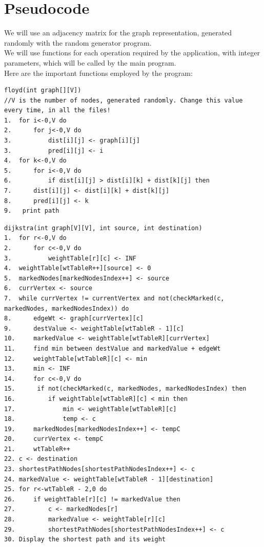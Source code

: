 \documentclass[14pt]{article}
\begin{document}
\section*{Pseudocode}
We will use an adjacency matrix for the graph representation, generated randomly with the random generator program. 
\\
We will use functions for each operation required by the application, with integer parameters, which will be called by the main program.
\\
Here are the important functions employed by the program:
\begin{lstlisting}
floyd(int graph[][V])
//V is the number of nodes, generated randomly. Change this value every time, in all the files!
1.	for i<-0,V do
2.	    for j<-0,V do
3.	        dist[i][j] <- graph[i][j]
3.          pred[i][j] <- i
4.	for k<-0,V do
5.      for i<-0,V do
6.          if dist[i][j] > dist[i][k] + dist[k][j] then
7.      dist[i][j] <- dist[i][k] + dist[k][j]
8.      pred[i][j] <- k
9.   print path
\end{lstlisting}
\begin{lstlisting}
dijkstra(int graph[V][V], int source, int destination)
1.	for r<-0,V do
2.	    for c<-0,V do
3.	        weightTable[r][c] <- INF
4.	weightTable[wtTableR++][source] <- 0
5.	markedNodes[markedNodesIndex++] <- source
6.	currVertex <- source  
7.	while currVertex != currentVertex and not(checkMarked(c, markedNodes, markedNodesIndex)) do
8.	    edgeWt <- graph[currVertex][c]
9.		destValue <- weightTable[wtTableR - 1][c]
10.		markedValue <- weightTable[wtTableR][currVertex]
11.		find min between destValue and markedValue + edgeWt
12.	    weightTable[wtTableR][c] <- min
13.	    min <- INF
14.     for c<-0,V do
15.      if not(checkMarked(c, markedNodes, markedNodesIndex) then
16.         if weightTable[wtTableR][c] < min then
17.             min <- weightTable[wtTableR][c]
18.             temp <- c
19.     markedNodes[markedNodesIndex++] <- tempC
20.     currVertex <- tempC
21.     wtTableR++
22. c <- destination
23. shortestPathNodes[shortestPathNodesIndex++] <- c
24. markedValue <- weightTable[wtTableR - 1][destination]
25. for r<-wtTableR - 2,0 do
26.     if weightTable[r][c] != markedValue then
27.         c <- markedNodes[r]
28.         markedValue <- weightTable[r][c]
29.         shortestPathNodes[shortestPathNodesIndex++] <- c
30. Display the shortest path and its weight
\end{lstlisting}




\newpage
\end{document}
